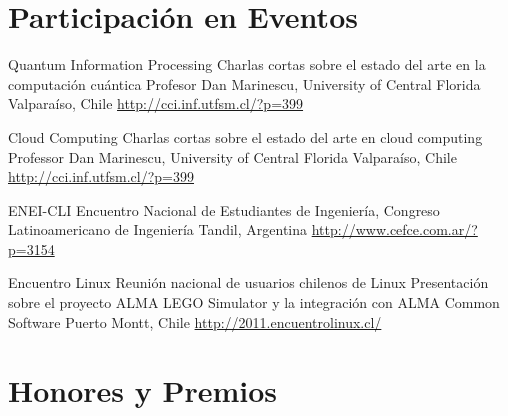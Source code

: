 \documentclass[11pt,a4paper]{moderncv}
\begin{document}
\section{Participación en Eventos}

        {Quantum Information Processing}
        {Charlas cortas sobre el estado del arte en la computación cuántica}
        {Profesor Dan Marinescu, University of Central Florida}
        {Valparaíso, Chile}
        {\url{http://cci.inf.utfsm.cl/?p=399}}
        
        {Cloud Computing}
        {Charlas cortas sobre el estado del arte en cloud computing}
        {Professor Dan Marinescu, University of Central Florida}
        {Valparaíso, Chile}
        {\url{http://cci.inf.utfsm.cl/?p=399}}

        {ENEI-CLI}
        {Encuentro Nacional de Estudiantes de Ingeniería, Congreso Latinoamericano de Ingeniería}{}
        {Tandil, Argentina}
        {\url{http://www.cefce.com.ar/?p=3154}}

        {Encuentro Linux}
        {Reunión nacional de usuarios chilenos de Linux}
        {Presentación sobre el proyecto ALMA LEGO Simulator y la integración con ALMA Common Software}
        {Puerto Montt, Chile}
        {\url{http://2011.encuentrolinux.cl/}}
        
\section{Honores y Premios}

\end{document}

